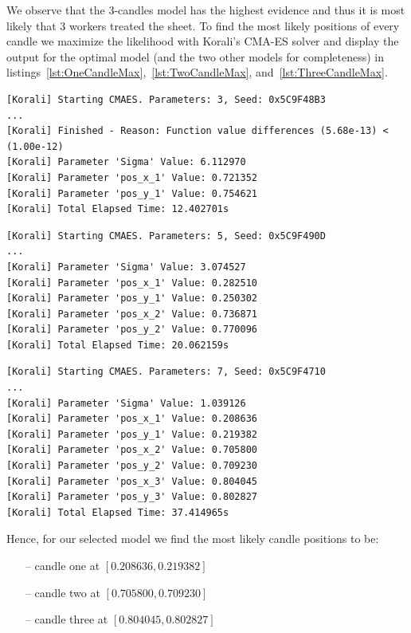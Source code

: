 \documentclass{article}
\begin{document}
    We observe that the 3-candles model has the highest evidence and thus it
    is most likely that 3 workers treated the sheet.
    To find the most likely positions of every candle we maximize the
    likelihood with Korali's CMA-ES solver and display the output for the
    optimal model (and the two other models for completeness) in
    listings~\ref{lst:OneCandleMax},~\ref{lst:TwoCandleMax},
    and~\ref{lst:ThreeCandleMax}.

    \begin{lstlisting}[basicstyle=\tiny, frame=single, caption={Korali
    output when maximizing the likelihood of the heat distribution given the
    model with one candle.}, label={lst:OneCandleMax}]
[Korali] Starting CMAES. Parameters: 3, Seed: 0x5C9F48B3
...
[Korali] Finished - Reason: Function value differences (5.68e-13) < (1.00e-12)
[Korali] Parameter 'Sigma' Value: 6.112970
[Korali] Parameter 'pos_x_1' Value: 0.721352
[Korali] Parameter 'pos_y_1' Value: 0.754621
[Korali] Total Elapsed Time: 12.402701s
    \end{lstlisting}
     \begin{lstlisting}[basicstyle=\tiny, frame=single, caption={Korali
    output when maximizing the likelihood of the heat distribution given the
     model with two candles.}, label={lst:TwoCandleMax}]
[Korali] Starting CMAES. Parameters: 5, Seed: 0x5C9F490D
...
[Korali] Parameter 'Sigma' Value: 3.074527
[Korali] Parameter 'pos_x_1' Value: 0.282510
[Korali] Parameter 'pos_y_1' Value: 0.250302
[Korali] Parameter 'pos_x_2' Value: 0.736871
[Korali] Parameter 'pos_y_2' Value: 0.770096
[Korali] Total Elapsed Time: 20.062159s
    \end{lstlisting}
     \begin{lstlisting}[basicstyle=\tiny, frame=single, caption={Korali
    output when maximizing the likelihood of the heat distribution given the
     model with three candles.}, label={lst:ThreeCandleMax}]
[Korali] Starting CMAES. Parameters: 7, Seed: 0x5C9F4710
...
[Korali] Parameter 'Sigma' Value: 1.039126
[Korali] Parameter 'pos_x_1' Value: 0.208636
[Korali] Parameter 'pos_y_1' Value: 0.219382
[Korali] Parameter 'pos_x_2' Value: 0.705800
[Korali] Parameter 'pos_y_2' Value: 0.709230
[Korali] Parameter 'pos_x_3' Value: 0.804045
[Korali] Parameter 'pos_y_3' Value: 0.802827
[Korali] Total Elapsed Time: 37.414965s
    \end{lstlisting}

    Hence, for our selected model we find the most likely candle positions to
    be:
    \begin{itemize}
        \item[--] candle one at $[0.208636, 0.219382]$
        \item[--] candle two at $[0.705800, 0.709230]$
        \item[--] candle three at $[0.804045, 0.802827]$
    \end{itemize}
\end{document}
